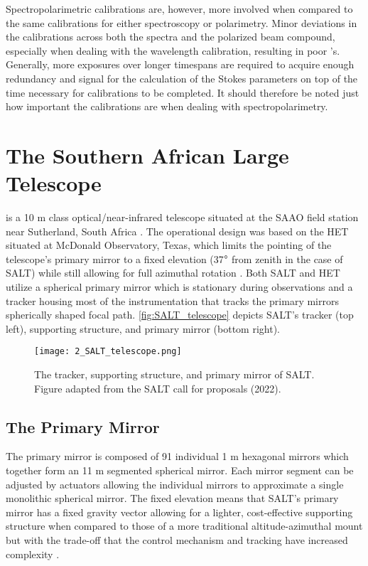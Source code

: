 Spectropolarimetric calibrations are, however, more involved when compared to the same calibrations for either spectroscopy or polarimetry. Minor deviations in the calibrations across both the spectra and the polarized beam compound, especially when dealing with the wavelength calibration, resulting in poor 's. Generally, more exposures over longer timespans are required to acquire enough redundancy and signal for the calculation of the Stokes parameters on top of the time necessary for calibrations to be completed. It should therefore be noted just how important the calibrations are when dealing with spectropolarimetry.

\section{The Southern African Large Telescope} \label{sec:SALT} %

 is a 10 m class optical/near-infrared telescope situated at the \gls{SAAO} field station near Sutherland, South Africa \citep{SALT_optical_design}. The operational design was based on the \gls{HET} situated at McDonald Observatory, Texas, which limits the pointing of the telescope's primary mirror to a fixed elevation (37$\degree$ from zenith in the case of SALT) while still allowing for full azimuthal rotation \citep{HET}. Both SALT and HET utilize a spherical primary mirror which is stationary during observations and a tracker housing most of the instrumentation that tracks the primary mirrors spherically shaped focal path. \autoref{fig:SALT_telescope} depicts \gls{SALT}'s tracker (top left), supporting structure, and primary mirror (bottom right).

\begin{figure}[t]
    \centering
    \texttt{[image: 2\_SALT\_telescope.png]}
    \caption{The tracker, supporting structure, and primary mirror of SALT. Figure adapted from the SALT call for proposals (2022).\protect\footnotemark}
    \label{fig:SALT_telescope}
\end{figure}

\subsection{The Primary Mirror}

The primary mirror is composed of 91 individual 1 m hexagonal mirrors which together form an 11 m segmented spherical mirror. Each mirror segment can be adjusted by actuators allowing the individual mirrors to approximate a single monolithic spherical mirror. The fixed elevation means that SALT's primary mirror has a fixed gravity vector allowing for a lighter, cost-effective supporting structure when compared to those of a more traditional altitude-azimuthal mount but with the trade-off that the control mechanism and tracking have increased complexity \citep{SALT_design}.

